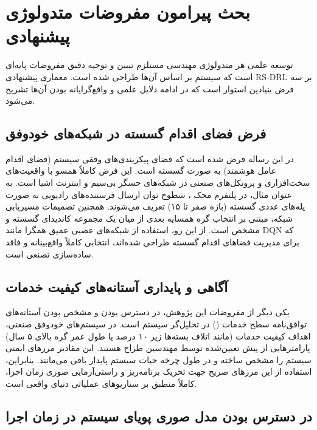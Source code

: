 \documentclass[oneside,openany,phd]{TMU-Thesis}
\begin{document}
\section{بحث پیرامون مفروضات متدولوژی پیشنهادی}

\label{sec:assumptions_discussion}

توسعه علمی هر متدولوژی مهندسی مستلزم تبیین و توجیه دقیق مفروضات پایه‌ای است که سیستم بر اساس آن‌ها طراحی شده است. معماری پیشنهادی RS-DRL بر سه فرض بنیادین استوار است که در ادامه دلایل علمی و واقع‌گرایانه بودن آن‌ها تشریح می‌شود.



\subsection{فرض فضای اقدام گسسته در شبکه‌های خودوفق}

در این رساله فرض شده است که فضای پیکربندی‌های وفقی سیستم (فضای اقدام عامل هوشمند) به صورت گسسته است. این فرض کاملاً همسو با واقعیت‌های سخت‌افزاری و پروتکل‌های صنعتی در شبکه‌های حسگر بی‌سیم و اینترنت اشیا است. به عنوان مثال، در پلتفرم محک  \cite{gerostathopoulos2019deltaiot}، سطوح توان ارسال فرستنده‌های رادیویی به صورت پله‌های عددی گسسته (بازه صفر تا ۱۵) تعریف می‌شوند. همچنین تصمیمات مسیریابی شبکه، مبتنی بر انتخاب گره همسایه بعدی از میان یک مجموعه کاندیدای گسسته و مشخص است. از این رو، استفاده از شبکه‌های عصبی عمیق همگرا مانند DQN که برای مدیریت فضاهای اقدام گسسته طراحی شده‌اند، انتخابی کاملاً واقع‌بینانه و فاقد ساده‌سازی تصنعی است.



\subsection{آگاهی و پایداری آستانه‌های کیفیت خدمات}

یکی دیگر از مفروضات این پژوهش، در دسترس بودن و مشخص بودن آستانه‌های توافق‌نامه سطح خدمات () در تحلیل‌گر سیستم است. در سیستم‌های خودوفق صنعتی، اهداف کیفیت خدمات (مانند اتلاف بسته‌ها زیر ۱۰ درصد یا طول عمر گره بالای ۵ سال) پارامترهایی از پیش تعیین‌شده توسط مهندسین طراح هستند. این مقادیر مرزهای ایمنی سیستم را مشخص ساخته و در طول چرخه حیات سیستم پایدار باقی می‌مانند. بنابراین، استفاده از این مرزهای صریح جهت تحریک برنامه‌ریز و راستی‌آزمایی صوری زمان اجرا، کاملاً منطبق بر سناریوهای عملیاتی دنیای واقعی است.



\subsection{در دسترس بودن مدل صوری پویای سیستم در زمان اجرا}
\end{document}
